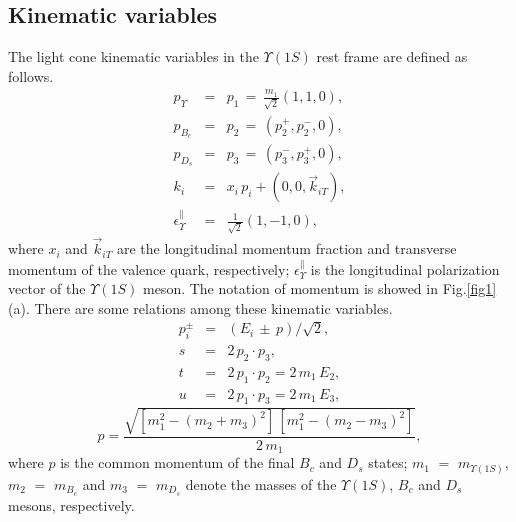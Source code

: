 \documentclass[preprint,superscriptaddress,nofootinbib]{revtex4}
\begin{document}
  \subsection{Kinematic variables}
  \label{sec0203}
  The light cone kinematic variables in the ${\Upsilon}(1S)$
  rest frame are defined as follows.
  \begin{eqnarray}
  p_{{\Upsilon}} &=& p_{1}\, =\, \frac{m_{1}}{\sqrt{2}}(1,1,0)
  \label{kine-p1}, \\
  p_{B_{c}} &=& p_{2}\, =\, (p_{2}^{+},p_{2}^{-},0)
  \label{kine-p2}, \\
  p_{D_{s}} &=& p_{3}\, =\, (p_{3}^{-},p_{3}^{+},0)
  \label{kine-p3}, \\
  k_{i} &=& x_{i}\,p_{i}+(0,0,\vec{k}_{iT})
  \label{kine-ki}, \\
  {\epsilon}_{\Upsilon}^{\parallel} &=& \frac{1}{ \sqrt{2} }(1,-1,0)
  \label{kine-1el},
  \end{eqnarray}
  where $x_{i}$ and $\vec{k}_{iT}$ are the
  longitudinal momentum fraction and transverse
  momentum of the valence quark, respectively;
  ${\epsilon}_{\Upsilon}^{\parallel}$ is the
  longitudinal polarization vector of the
  ${\Upsilon}(1S)$ meson.
  The notation of momentum is showed in Fig.\ref{fig1}(a).
  There are some relations among these kinematic variables.
  \begin{eqnarray}
  p_{i}^{\pm} &=& (E_{i}\,{\pm}\,p)/\sqrt{2}
  \label{kine-pipm}, \\
  s &=& 2\,p_{2}{\cdot}p_{3}
  \label{kine-s}, \\
  t &=& 2\,p_{1}{\cdot}p_{2} = 2\,m_{1}\,E_{2}
  \label{kine-t}, \\
  u &=& 2\,p_{1}{\cdot}p_{3} = 2\,m_{1}\,E_{3}
  \label{kine-u},
  \end{eqnarray}
  \begin{equation}
  p = \frac{\sqrt{ [m_{1}^{2}-(m_{2}+m_{3})^{2}]\,[m_{1}^{2}-(m_{2}-m_{3})^{2}] }}{2\,m_{1}}
  \label{kine-pcm},
  \end{equation}
  where $p$ is the common momentum of
  the final $B_{c}$ and $D_{s}$ states;
  $m_{1}$ $=$ $m_{{\Upsilon}(1S)}$,
  $m_{2}$ $=$ $m_{B_{c}}$ and
  $m_{3}$ $=$ $m_{D_{s}}$ denote the masses
  of the ${\Upsilon}(1S)$, $B_{c}$ and $D_{s}$
  mesons, respectively.
\end{document}
